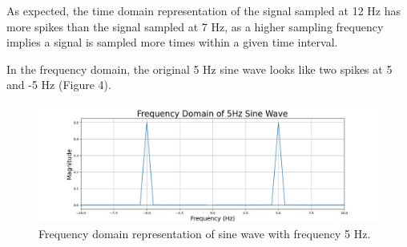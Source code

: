 \documentclass{article}
\begin{document}

    
    

As expected, the time domain representation of the signal sampled at 12 Hz has more spikes than the signal sampled at 7 Hz, as a higher sampling frequency implies a signal is sampled more times within a given time interval.

In the frequency domain, the original 5 Hz sine wave looks like two spikes at 5 and -5 Hz (Figure 4).
\begin{figure}[H]
    \includegraphics[width=\linewidth]{images/freqdomain_5hz.png}
    \caption{Frequency domain representation of sine wave with frequency 5 Hz.}
    \label{fig:enter-label}
\end{figure}
\end{document}

